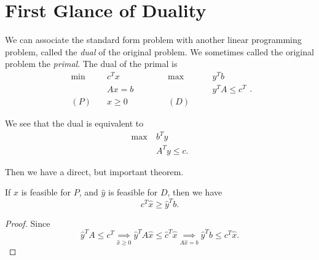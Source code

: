 \section{First Glance of Duality}
We can associate the standard form problem with another linear programming problem, called the \emph{dual} of the original problem.
We sometimes called the original problem the \emph{primal}. The dual of the primal is
\[
	\begin{alignedat}{5}
		\min~&c^{T}x\qquad\qquad &&\max ~ &&y^{T}b\\
		&Ax = b && &&y^{T}A\leq c^{T}\\
		(P)\quad&x\geq  0 &&(D)\quad&&
	\end{alignedat}.
\]

\begin{note}
	We see that the dual is equivalent to
	\begin{align*}
		\max~ & b^{T}y         \\
		      & A^{T}y \leq c.
	\end{align*}
\end{note}

Then we have a direct, but important theorem.
\begin{theorem}\label{Weak Duality Theorem}
	If \(\hat{x}\) is feasible for \(P\), and \(\hat{y}\) is feasible for \(D\), then we have
	\[
		c^{T}\hat{x} \geq  \hat{y}^{T} b.
	\]
\end{theorem}
\begin{proof}
	Since
	\[
		\hat{y}^{T}A\leq c^{T} \underset{\hat{x}\geq 0}{\implies} \hat{y}^{T}A \hat{x} \leq \hat{c}^{T} \hat{x} \underset{A \hat{x} = b}{\implies} \hat{y}^{T}b \leq c^{T} \hat{x}.
	\]
\end{proof}

